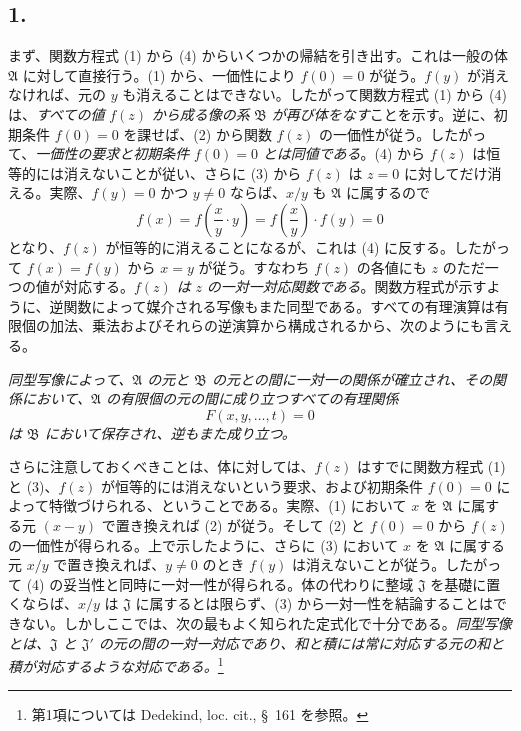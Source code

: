 \subsection*{1.}

まず、関数方程式 (1) から (4) からいくつかの帰結を引き出す。これは一般の体 $\mathfrak A$ に対して直接行う。(1) から、一価性により $f(0)=0$ が従う。$f(y)$ が消えなければ、元の $y$ も消えることはできない。したがって関数方程式 (1) から (4) は、\emph{すべての値} $f(z)$ \emph{から成る像の系} $\mathfrak B$ \emph{が再び体をなす}ことを示す。逆に、初期条件 $f(0)=0$ を課せば、(2) から関数 $f(z)$ の一価性が従う。したがって、\emph{一価性の要求と初期条件} $f(0)=0$ \emph{とは同値である}。(4) から $f(z)$ は恒等的には消えないことが従い、さらに (3) から $f(z)$ は $z=0$ に対してだけ消える。実際、$f(y)=0$ かつ $y\ne0$ ならば、$x/y$ も $\mathfrak A$ に属するので
\[
f(x)=f\!\left(\frac{x}{y}\cdot y\right)=f\!\left(\frac{x}{y}\right)\cdot f(y)=0
\]
となり、$f(z)$ が恒等的に消えることになるが、これは (4) に反する。したがって $f(x)=f(y)$ から $x=y$ が従う。すなわち $f(z)$ の各値にも $z$ のただ一つの値が対応する。\emph{$f(z)$ は} $z$ \emph{の一対一対応関数である}。関数方程式が示すように、逆関数によって媒介される写像もまた同型である。すべての有理演算は有限個の加法、乗法およびそれらの逆演算から構成されるから、次のようにも言える。

\emph{同型写像によって、$\mathfrak A$ の元と $\mathfrak B$ の元との間に一対一の関係が確立され、その関係において、$\mathfrak A$ の有限個の元の間に成り立つすべての有理関係
\[
F(x,y,\ldots,t)=0
\]
は $\mathfrak B$ において保存され、逆もまた成り立つ。}

さらに注意しておくべきことは、体に対しては、$f(z)$ はすでに関数方程式 (1) と (3)、$f(z)$ が恒等的には消えないという要求、および初期条件 $f(0)=0$ によって特徴づけられる、ということである。実際、(1) において $x$ を $\mathfrak A$ に属する元 $(x-y)$ で置き換えれば (2) が従う。そして (2) と $f(0)=0$ から $f(z)$ の一価性が得られる。上で示したように、さらに (3) において $x$ を $\mathfrak A$ に属する元 $x/y$ で置き換えれば、$y\ne0$ のとき $f(y)$ は消えないことが従う。したがって (4) の妥当性と同時に一対一性が得られる。体の代わりに整域 $\mathfrak J$ を基礎に置くならば、$x/y$ は $\mathfrak J$ に属するとは限らず、(3) から一対一性を結論することはできない。しかしここでは、次の最もよく知られた定式化で十分である。\emph{同型写像とは、$\mathfrak J$ と $\mathfrak J'$ の元の間の一対一対応であり、和と積には常に対応する元の和と積が対応するような対応である。}\footnote{第1項については Dedekind, loc. cit., \S\ 161 を参照。}


